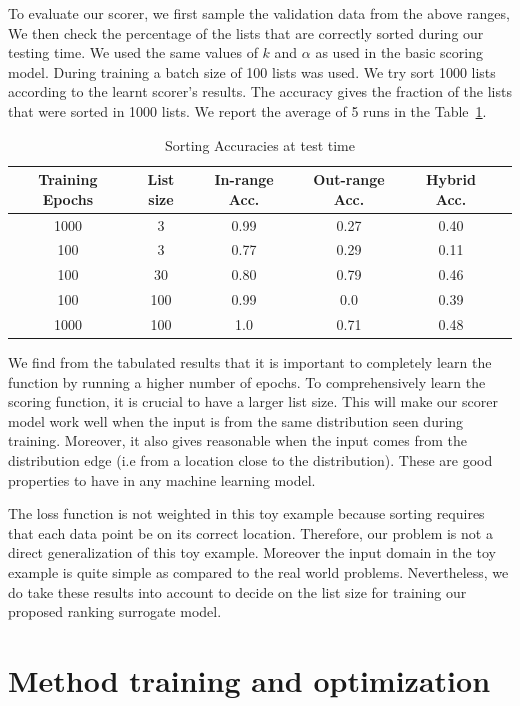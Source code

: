 \documentclass[12pt, twoside, ngerman]{report}
\begin{document}
To evaluate our scorer,  we first sample the validation data from the above ranges,
We then check the percentage of the lists that are correctly sorted during our testing time.
We used the same values of $k$ and $\alpha$ as used in the basic scoring model.
During training a batch size of 100 lists was used.
We try sort 1000 lists according to the learnt scorer's results.
The accuracy gives the fraction of the lists that were sorted in 1000 lists.
We report the average of 5 runs in the Table~\ref{table:caseStudyResults}.

\begin{table} [h!]
\centering
\resizebox{\linewidth}{!} {
\begin{tabular}{ | c | c | c | c | c | c | }
\hline
\textbf{Training Epochs} & \textbf{List size} & \textbf{In-range Acc.} & \textbf{Out-range Acc.} & \textbf{Hybrid Acc.} \\ [0.5 ex]
\hline \hline
1000 & 3 & 0.99 & 0.27 & 0.40\\
100 & 3  & 0.77 & 0.29 & 0.11\\
100 & 30  & 0.80 & 0.79 & 0.46\\
100 & 100  & 0.99 & 0.0 & 0.39\\
1000 & 100  & 1.0 & 0.71 & 0.48\\
\hline
\end{tabular}
}
\caption{Sorting Accuracies at test time}
\label {table:caseStudyResults}
\end{table}

We find from the tabulated results that it is important to completely learn the function by running a higher number of epochs.
To comprehensively learn the scoring function,  it is crucial to have a larger list size.
This will make our scorer model work well when the input is from the same distribution seen during training.
Moreover,  it also gives reasonable when the input comes from the distribution edge (i.e from a location close to the distribution).
These are good properties to have in any machine learning model.

The loss function is not weighted in this toy example because sorting requires that each data point be on its correct location.
Therefore,  our problem is not a direct generalization of this toy example.
Moreover the input domain in the toy example is quite simple as compared to the real world problems.
Nevertheless,  we do take these results into account to decide on the list size for training our proposed ranking surrogate model.

\section{Method training and optimization}
\end{document}
